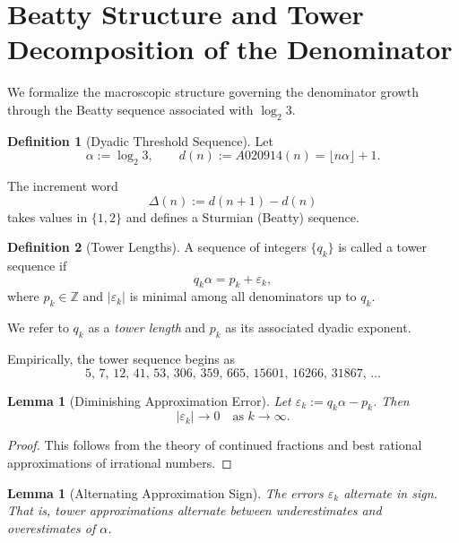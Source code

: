 \documentclass[12pt, oneside]{article}
\numberwithin{equation}{section}
\theoremstyle{definition}
\newtheorem{definition}{Definition}[section]
\theoremstyle{plain}
\newtheorem{lemma}[theorem]{Lemma}
\theoremstyle{remark}
\begin{document}
\section{Beatty Structure and Tower Decomposition of the Denominator}
\label{sec:beatty-towers}

We formalize the macroscopic structure governing the denominator growth
through the Beatty sequence associated with $\log_2 3$.


\begin{definition}[Dyadic Threshold Sequence]
Let
\[
\alpha := \log_2 3,
\qquad
d(n) := A020914(n) = \lfloor n\alpha \rfloor + 1.
\]
\end{definition}

The increment word
\[
\Delta(n) := d(n+1)-d(n)
\]
takes values in $\{1,2\}$ and defines a Sturmian (Beatty) sequence.


\begin{definition}[Tower Lengths]
A sequence of integers $\{q_k\}$ is called a tower sequence if
\[
q_k \alpha = p_k + \varepsilon_k,
\]
where $p_k \in \mathbb{Z}$ and $|\varepsilon_k|$ is minimal among all
denominators up to $q_k$.

We refer to $q_k$ as a \emph{tower length} and $p_k$ as its associated
dyadic exponent.
\end{definition}

Empirically, the tower sequence begins as
\[
5,\,7,\,12,\,41,\,53,\,306,\,359,\,665,\,15601,\,16266,\,31867,\,\dots
\]


\begin{lemma}[Diminishing Approximation Error]
\label{lem:tower-error}
Let $\varepsilon_k := q_k \alpha - p_k$.
Then
\[
|\varepsilon_k| \to 0 \quad \text{as } k \to \infty.
\]
\end{lemma}

\begin{proof}
This follows from the theory of continued fractions and best rational
approximations of irrational numbers.
\end{proof}


\begin{lemma}[Alternating Approximation Sign]
\label{lem:alternating}
The errors $\varepsilon_k$ alternate in sign.  That is,
tower approximations alternate between underestimates and overestimates
of $\alpha$.
\end{lemma}
\end{document}

